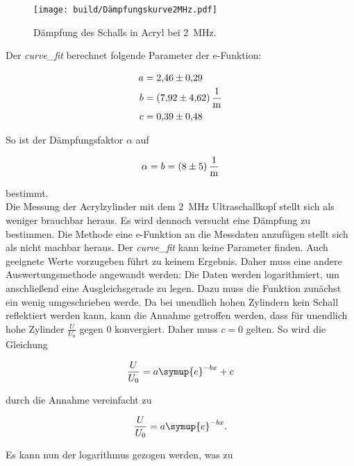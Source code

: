 \begin{figure}[H]
    \centering
    \texttt{[image: build/Dämpfungskurve2MHz.pdf]}
    \caption{Dämpfung des Schalls in Acryl bei \qty{2}{\mega\hertz}.}
    \label{fig:Kurve2MHz}
\end{figure}

\noindent Der \emph{curve\_fit} berechnet folgende Parameter der e-Funktion:

\begin{align*}
    a &= \num{2.46\pm0.29} \\
    b &= \qty{7.92\pm4.62}{\per \meter} \\
    c &= \num{0.39\pm0.48} \\
\end{align*}

\noindent So ist der Dämpfungsfaktor $\alpha$ auf 

\begin{align*}
    \alpha = b = \qty{8\pm5}{\per \meter}
\end{align*}

\noindent bestimmt.\\

\noindent Die Messung der Acrylzylinder mit dem \qty{2}{\mega\hertz} Ultraschallkopf stellt sich als weniger brauchbar heraus. 
Es wird dennoch versucht eine Dämpfung zu bestimmen. Die Methode eine e-Funktion an die Messdaten anzufügen stellt 
sich als nicht machbar heraus. Der \emph{curve\_fit} kann keine Parameter finden. Auch geeignete Werte vorzugeben 
führt zu keinem Ergebnis. Daher muss eine andere Auswertungsmethode angewandt werden: Die Daten werden logarithmiert, 
um anschließend eine Ausgleichsgerade zu legen. Dazu muss die Funktion zunächst ein wenig umgeschrieben werde. 
Da bei unendlich hohen Zylindern kein Schall reflektiert werden kann, kann die Annahme getroffen werden, dass für 
unendlich hohe Zylinder $\frac{U}{U_0}$ gegen $0$ konvergiert. Daher muss $c=0$ gelten.
So wird die Gleichung 

\begin{equation*}
    \frac{U}{U_0} = a \symup{e} ^{-bx} +c
\end{equation*}

\noindent durch die Annahme vereinfacht  zu

\begin{equation*}
    \frac{U}{U_0} = a \symup{e} ^{-bx}.
\end{equation*}

\noindent Es kann nun der logarithmus gezogen werden, was zu 

